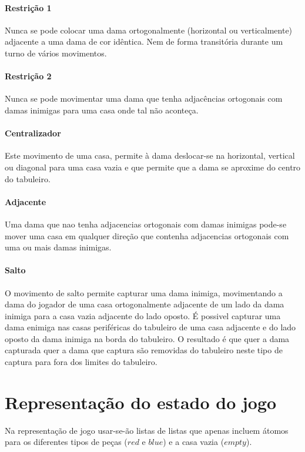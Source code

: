 \documentclass[a4paper,11pt,titlepage]{article}
\begin{document}
\paragraph{Restrição 1}
Nunca se pode colocar uma dama ortogonalmente (horizontal ou verticalmente) adjacente a uma dama de cor idêntica. Nem de forma transitória durante um turno de vários movimentos.

\paragraph{Restrição 2}
Nunca se pode movimentar uma dama que tenha adjacências ortogonais com damas inimigas para uma casa onde tal não aconteça.

\paragraph{Centralizador}
Este movimento de uma casa, permite à dama deslocar-se na horizontal, vertical ou diagonal para uma casa vazia e que permite que a dama se aproxime do centro do tabuleiro.


\paragraph{Adjacente}
Uma dama que nao tenha adjacencias ortogonais com damas inimigas pode-se mover uma casa em qualquer direção que  contenha adjacencias ortogonais com uma ou mais damas inimigas.

\paragraph{Salto}
O movimento de salto permite capturar uma dama inimiga, movimentando a dama do jogador de uma casa ortogonalmente adjacente de um lado da dama inimiga para a casa vazia adjacente do lado oposto. É possivel capturar uma dama enimiga nas casas periféricas do tabuleiro de uma casa adjacente e do lado oposto da dama inimiga na borda do tabuleiro. O resultado é que quer a dama capturada quer a dama que captura são removidas do tabuleiro neste tipo de captura para fora dos limites do tabuleiro.

\section{Representação do estado do jogo}

Na representação de jogo usar-se-ão listas de listas que apenas incluem
átomos para os diferentes tipos de peças ($red$ e $blue$) e a casa vazia ($empty$).
\end{document}
